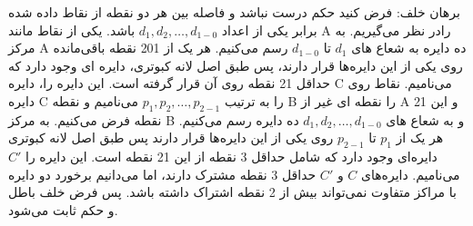 \p	
برهان خلف:	فرض کنید حکم درست نباشد و فاصله بین هر دو نقطه از نقاط داده شده برابر یکی از اعداد
$d_1, d_2, \ldots ,d_{1-0}$
باشد. یکی از نقاط مانند A رادر نظر می‌گیریم.
به مرکز A ده دایره به شعاع های
$d_1$
تا
$d_{1-0}$
رسم می‌کنیم.
هر یک از 201 نقطه باقی‌مانده روی یکی از این دایره‌ها قرار دارند، پس طبق اصل لانه کبوتری، دایره ای وجود دارد که حداقل 21 نقطه روی آن قرار گرفته است.
این دایره را، دایره C می‌نامیم.
نقاط روی دایره C را به ترتیب
$p_1, p_2, \ldots ,p_{2-1}$
می‌نامیم و نقطه B را نقطه ای غیر از A و این 21 نقطه فرض می‌کنیم.
به مرکز B و به شعاع های
$d_1, d_2, \ldots ,d_{1-0}$
ده دایره رسم می‌کنیم.
هر یک از 
$p_1$
تا
$p_{2-1}$
روی یکی از این دایره‌ها قرار دارند پس طبق اصل لانه کبوتری دایره‌ای وجود دارد که شامل حداقل 3 نقطه از این 21 نقطه است. این دایره را 
$C'$
می‌نامیم.
دایره‌های 
$C$
و
$C'$
حداقل 3 نقطه مشترک دارند، اما می‌دانیم برخورد دو دایره با مراکز متفاوت نمی‌تواند بیش از 2 نقطه اشتراک داشته باشد. پس فرض خلف باطل و حکم ثابت می‌شود.